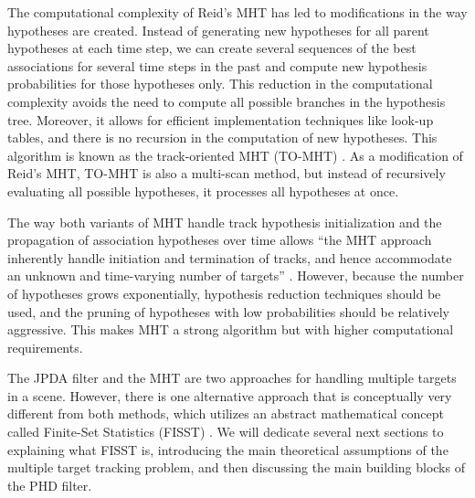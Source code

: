 The computational complexity of Reid's MHT has led to modifications in the way hypotheses are created. Instead of generating new hypotheses for all parent hypotheses at each time step, we can create several sequences of the best associations for several time steps in the past and compute new hypothesis probabilities for those hypotheses only. This reduction in the computational complexity avoids the need to compute all possible branches in the hypothesis tree. Moreover, it allows for efficient implementation techniques like look-up tables, and there is no recursion in the computation of new hypotheses. This algorithm is known as the track-oriented MHT (TO-MHT) \cite{werthmannStepbystepDescriptionComputationally1992}. As a modification of Reid's MHT, TO-MHT is also a multi-scan method, but instead of recursively evaluating all possible hypotheses, it processes all hypotheses at once.

The way both variants of MHT handle track hypothesis initialization and the propagation of association hypotheses over time allows ``the MHT approach inherently handle initiation and termination of tracks, and hence accommodate an unknown and time-varying number of targets'' \cite{voMultitargetTracking2015}. However, because the number of hypotheses grows exponentially, hypothesis reduction techniques should be used, and the pruning of hypotheses with low probabilities should be relatively aggressive. This makes MHT a strong algorithm but with higher computational requirements.

The JPDA filter and the MHT are two approaches for handling multiple targets in a scene. However, there is one alternative approach that is conceptually very different from both methods, which utilizes an abstract mathematical concept called Finite-Set Statistics (FISST) \cite{mahlerStatisticalMultisourcemultitargetInformation2007}. We will dedicate several next sections to explaining what FISST is, introducing the main theoretical assumptions of the multiple target tracking problem, and then discussing the main building blocks of the PHD filter.
